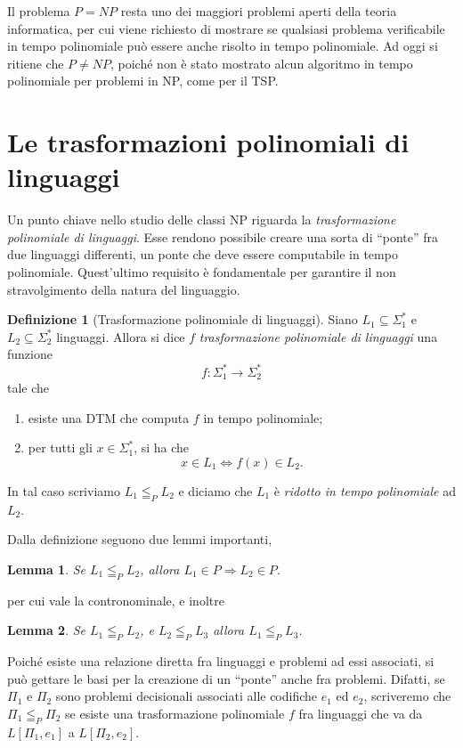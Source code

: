 \documentclass[10pt]{\classname}
\theoremstyle{newlinethm}
\theoremstyle{theorem}
\newtheorem{lemma}{Lemma}[section]
\theoremstyle{definition}
\newtheorem{definizione}{Definizione}[section]
\theoremstyle{definition}
\theoremstyle{definition}
\theoremstyle{definition}
\begin{document}
Il problema $P = NP$ resta uno dei maggiori problemi aperti della teoria informatica, per cui viene richiesto di mostrare se qualsiasi problema verificabile in tempo polinomiale può essere anche risolto in tempo polinomiale. Ad oggi si ritiene che $P \neq NP$, poiché non è stato mostrato alcun algoritmo in tempo polinomiale per problemi in NP, come per il TSP.

\section{Le trasformazioni polinomiali di linguaggi}

Un punto chiave nello studio delle classi NP riguarda la \emph{trasformazione polinomiale di linguaggi}. Esse rendono possibile creare una sorta di ``ponte'' fra due linguaggi differenti, un ponte che deve essere computabile in tempo polinomiale. Quest'ultimo requisito è fondamentale per garantire il non stravolgimento della natura del linguaggio.

\begin{definizione}[Trasformazione polinomiale di linguaggi]
    Siano $L_1 \subseteq \Sigma_1^*$ e $L_2 \subseteq \Sigma_2^*$ linguaggi. Allora si dice $f$ \emph{trasformazione polinomiale di linguaggi} una funzione \[f:\Sigma_1^* \rightarrow \Sigma_2^*\] tale che 
\begin{enumerate}
    \item esiste una DTM che computa $f$ in tempo polinomiale;
    \item per tutti gli $x \in \Sigma_1^*$, si ha che \[x \in L_1 \Leftrightarrow f(x) \in L_2.\]
\end{enumerate}
In tal caso scriviamo $L_1 \leqq_P L_2$ e diciamo che $L_1$ è \emph{ridotto in tempo polinomiale} ad $L_2$.
\end{definizione}
Dalla definizione seguono due lemmi importanti,
\begin{lemma}
    Se $L_1 \leqq_P L_2$, allora $L_1 \in P \Rightarrow L_2 \in P$.
\end{lemma}
per cui vale la contronominale, e inoltre
\begin{lemma}
    Se $L_1 \leqq_P L_2$, e $L_2 \leqq_P L_3$ allora $L_1 \leqq_P L_3$.
\end{lemma}

Poiché esiste una relazione diretta fra linguaggi e problemi ad essi associati, si può gettare le basi per la creazione di un ``ponte'' anche fra problemi.
Difatti, se $\Pi_1$ e $\Pi_2$ sono problemi decisionali associati alle codifiche $e_1$ ed $e_2$, scriveremo che $\Pi_1 \leqq_P \Pi_2$ se esiste una trasformazione polinomiale $f$ fra linguaggi che va da $L[\Pi_1, e_1]$ a $L[\Pi_2, e_2]$.
\end{document}

